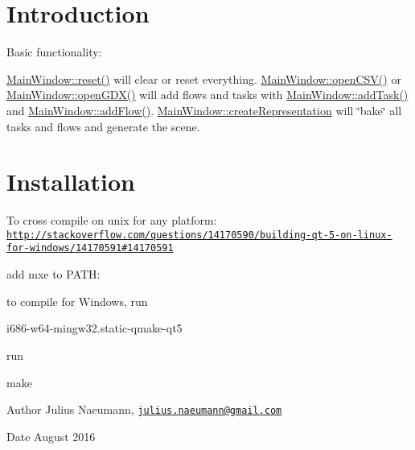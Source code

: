 \hypertarget{index_intro_sec}{}\section{Introduction}\label{index_intro_sec}
Basic functionality\+:

\hyperlink{class_main_window_a02076de46e6810174817ebfc6ddd2be5}{Main\+Window\+::reset()} will clear or reset everything. \hyperlink{class_main_window_a580a35d29abc0a0c82edf183e7f87b74}{Main\+Window\+::open\+C\+S\+V()} or \hyperlink{class_main_window_a23e9c749c8f0e5119317ea6484b9476f}{Main\+Window\+::open\+G\+D\+X()} will add flows and tasks with \hyperlink{class_main_window_a2920d5c6c64925cb5f87c7fdac3f54b0}{Main\+Window\+::add\+Task()} and \hyperlink{class_main_window_a645f1cd085c2636dc4eccb320455a6f4}{Main\+Window\+::add\+Flow()}. \hyperlink{class_main_window_a0b3d1510d0e0ed665daa74d6823e00d6}{Main\+Window\+::create\+Representation} will \char`\"{}bake\char`\"{} all tasks and flows and generate the scene.\hypertarget{index_install_sec}{}\section{Installation}\label{index_install_sec}
To cross compile on unix for any platform\+: \href{http://stackoverflow.com/questions/14170590/building-qt-5-on-linux-for-windows/14170591#14170591}{\tt http\+://stackoverflow.\+com/questions/14170590/building-\/qt-\/5-\/on-\/linux-\/for-\/windows/14170591\#14170591}


\begin{DoxyEnumerate}
\item add mxe to P\+A\+T\+H\+:

\item to compile for Windows, run
\begin{DoxyCode}
i686-w64-mingw32.static-qmake-qt5 
\end{DoxyCode}

\item run
\begin{DoxyCode}
make 
\end{DoxyCode}

\end{DoxyEnumerate}

\begin{DoxyAuthor}{Author}
Julius Naeumann, \href{mailto:julius.naeumann@gmail.com}{\tt julius.\+naeumann@gmail.\+com} 
\end{DoxyAuthor}
\begin{DoxyDate}{Date}
August 2016 
\end{DoxyDate}

